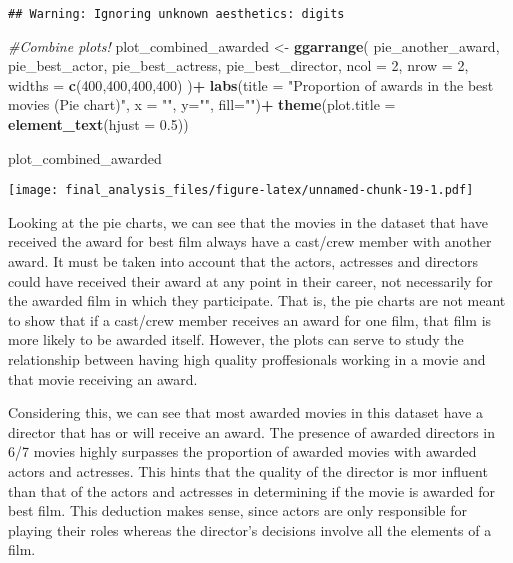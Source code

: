 \documentclass[]{article}
\newenvironment{Shaded}{\begin{snugshade}}{\end{snugshade}}
\newcommand{\CommentTok}[1]{\textcolor[rgb]{0.56,0.35,0.01}{\textit{#1}}}
\newcommand{\DataTypeTok}[1]{\textcolor[rgb]{0.13,0.29,0.53}{#1}}
\newcommand{\DecValTok}[1]{\textcolor[rgb]{0.00,0.00,0.81}{#1}}
\newcommand{\FloatTok}[1]{\textcolor[rgb]{0.00,0.00,0.81}{#1}}
\newcommand{\KeywordTok}[1]{\textcolor[rgb]{0.13,0.29,0.53}{\textbf{#1}}}
\newcommand{\NormalTok}[1]{#1}
\newcommand{\OperatorTok}[1]{\textcolor[rgb]{0.81,0.36,0.00}{\textbf{#1}}}
\newcommand{\StringTok}[1]{\textcolor[rgb]{0.31,0.60,0.02}{#1}}
\begin{document}
\begin{verbatim}
## Warning: Ignoring unknown aesthetics: digits
\end{verbatim}

\begin{Shaded}
\begin{Highlighting}[]
 \CommentTok{#Combine plots!}
\NormalTok{ plot_combined_awarded <-}
\StringTok{   }\KeywordTok{ggarrange}\NormalTok{(}
\NormalTok{     pie_another_award,}
\NormalTok{     pie_best_actor,}
\NormalTok{    pie_best_actress,}
\NormalTok{    pie_best_director,}
    \DataTypeTok{ncol =} \DecValTok{2}\NormalTok{,}
    \DataTypeTok{nrow =} \DecValTok{2}\NormalTok{,}
    \DataTypeTok{widths =} \KeywordTok{c}\NormalTok{(}\DecValTok{400}\NormalTok{,}\DecValTok{400}\NormalTok{,}\DecValTok{400}\NormalTok{,}\DecValTok{400}\NormalTok{)}
\NormalTok{  )}\OperatorTok{+}
\StringTok{  }\KeywordTok{labs}\NormalTok{(}\DataTypeTok{title =} \StringTok{"Proportion of awards in the best movies (Pie chart)"}\NormalTok{, }\DataTypeTok{x =} \StringTok{""}\NormalTok{, }\DataTypeTok{y=}\StringTok{""}\NormalTok{, }\DataTypeTok{fill=}\StringTok{""}\NormalTok{)}\OperatorTok{+}
\StringTok{  }\KeywordTok{theme}\NormalTok{(}\DataTypeTok{plot.title =} \KeywordTok{element_text}\NormalTok{(}\DataTypeTok{hjust =} \FloatTok{0.5}\NormalTok{))}

\NormalTok{plot_combined_awarded}
\end{Highlighting}
\end{Shaded}

\texttt{[image: final\_analysis\_files/figure-latex/unnamed-chunk-19-1.pdf]}

Looking at the pie charts, we can see that the movies in the dataset
that have received the award for best film always have a cast/crew
member with another award. It must be taken into account that the
actors, actresses and directors could have received their award at any
point in their career, not necessarily for the awarded film in which
they participate. That is, the pie charts are not meant to show that if
a cast/crew member receives an award for one film, that film is more
likely to be awarded itself. However, the plots can serve to study the
relationship between having high quality proffesionals working in a
movie and that movie receiving an award.

Considering this, we can see that most awarded movies in this dataset
have a director that has or will receive an award. The presence of
awarded directors in 6/7 movies highly surpasses the proportion of
awarded movies with awarded actors and actresses. This hints that the
quality of the director is mor influent than that of the actors and
actresses in determining if the movie is awarded for best film. This
deduction makes sense, since actors are only responsible for playing
their roles whereas the director's decisions involve all the elements of
a film.
\end{document}
